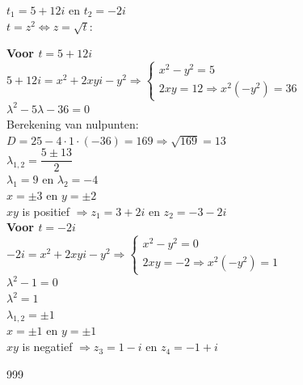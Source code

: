 \documentclass[a4paper]{article}
\begin{document}
$t_{1} = 5 + 12i$ en $t_{2} = -2i$\\

$ t = z^2 \Leftrightarrow z = \sqrt{t}:$\\

\newpage

\textbf{Voor $t = 5 + 12i$}\\

$ 5 + 12i = x^2 + 2xyi - y^2 \Rightarrow \left\{
\begin{array}{l}
	x^2 - y^2 = 5 \\
	2xy = 12 \Rightarrow x^2(-y^2) = 36
\end{array}
\right . $\\

$ \lambda^2 - 5\lambda - 36 = 0$\\

Berekening van nulpunten:\\

$D = 25 - 4 \cdot 1 \cdot (-36) = 169 \Rightarrow \sqrt{169} = 13$\\

$\lambda_{1,2} = \dfrac{5 \pm 13}{2}$\\

$\lambda_{1} = 9$ en $\lambda_{2} = -4$\\

$ x = \pm 3$ en $y = \pm 2$\\

$xy$ is positief $\Rightarrow z_{1} = 3 + 2i$ en $z_{2} = -3 -2i$\\

 \textbf{Voor $t = -2i$}\\

$ -2i = x^2 + 2xyi - y^2 \Rightarrow \left\{
\begin{array}{l}
	x^2 - y^2 = 0 \\
	2xy = -2 \Rightarrow x^2(-y^2) = 1
\end{array}
\right . $\\

$\lambda^2 - 1 = 0$\\

$\lambda^2 = 1$\\

$\lambda_{1, 2} = \pm 1$\\

$x = \pm 1$ en $y = \pm 1$\\

$xy$ is negatief $\Rightarrow z_{3} = 1 - i$ en $z_{4} = -1 + i$\\

\begin{thebibliography}{999}
\end{thebibliography}
\end{document}
